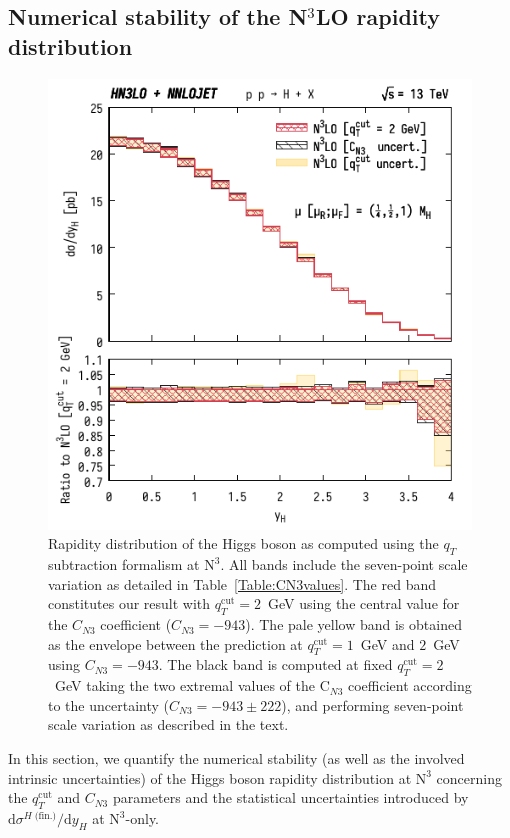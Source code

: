 \documentclass[12pt]{article}
\DeclareRobustCommand{\qt}{\ensuremath{q_T}\xspace}
\DeclareRobustCommand{\qtcut}{\ensuremath{q_T^\mathrm{cut}}\xspace}
\DeclareRobustCommand{\rd}{\ensuremath{\mathrm{d}}}
\DeclareRobustCommand{\fin}{\text{(fin.)}\xspace}
\DeclareRobustCommand{\LO}{\text{LO}\xspace}
\DeclareRobustCommand{\N}[1]{\ensuremath{\text{N}^{#1}}} %
\begin{document}
\subsection{Numerical stability of the \texorpdfstring{N${}^\text{3}$LO}{N3LO} rapidity distribution}
\label{sec:N3LOrap}

\begin{figure}[tbh]
\centering
\includegraphics[width=.6\linewidth]{./new_figures/yH_B02_only_N3LO_qTcut_uncert_CN3_uncert}
\caption{\label{fig:yHN3LOonly}{Rapidity distribution of the Higgs boson as computed using the $\qt$ subtraction formalism at \N3\LO. All bands include the seven-point scale variation as detailed in Table~\ref{Table:CN3values}. The red band constitutes our result with $\qtcut=2$~GeV using the central value for the $C_{N3}$ coefficient ($C_{N3}=-943$). The pale yellow band is obtained as the envelope between the prediction at $\qtcut=1$~GeV and $2$~GeV using $C_{N3}=-943$. The black band is computed at fixed $\qtcut=2$~GeV  taking the two extremal values of the C$_{N3}$ coefficient according to the uncertainty ($C_{N3}=-943 \pm 222$), and performing seven-point scale variation as described in the text.
}}
\end{figure}

In this section, we quantify the numerical stability (as well as the involved intrinsic uncertainties) of the Higgs boson rapidity distribution at \N3\LO concerning the $\qtcut$ and $C_{N3}$ parameters and the statistical uncertainties introduced by $\rd\sigma^{H\;\fin}/\rd y_H$ at \N3\LO-only.
\end{document}
